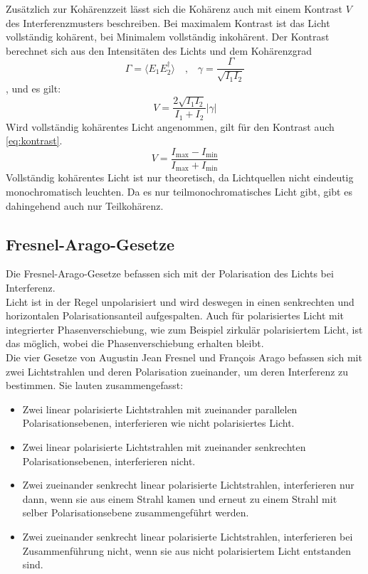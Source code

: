 Zusätzlich zur Kohärenzzeit lässt sich die Kohärenz auch mit einem Kontrast $V$ des Interferenzmusters beschreiben.
Bei maximalem Kontrast ist das Licht vollständig kohärent, bei Minimalem vollständig inkohärent.
Der Kontrast berechnet sich aus den Intensitäten des Lichts und dem Kohärenzgrad
\begin{equation}
    \Gamma = \langle E_1 E_2^\dagger \rangle \quad \text{,} \quad \gamma = \frac{\Gamma}{\sqrt{I_1 I_2}}
    \label{eq:grad}
\end{equation}
, und es gilt:
\begin{equation}
    V = \frac{2\sqrt{I_1I_2}}{I_1 + I_2}|\gamma|
    \label{eq:kontrast_formel}
\end{equation}
Wird vollständig kohärentes Licht angenommen, gilt für den Kontrast auch \autoref{eq:kontrast}.
\begin{equation}
    V = \frac{I_{\text{max}} - I_{\text{min}}}{I_{\text{max}} + I_{\text{min}}}
    \label{eq:kontrast}
\end{equation}
Vollständig kohärentes Licht ist nur theoretisch, da Lichtquellen nicht eindeutig monochromatisch leuchten.
Da es nur teilmonochromatisches Licht gibt, gibt es dahingehend auch nur Teilkohärenz.

\subsection{Fresnel-Arago-Gesetze}
Die Fresnel-Arago-Gesetze befassen sich mit der Polarisation des Lichts bei Interferenz.\\
Licht ist in der Regel unpolarisiert und wird deswegen in einen senkrechten und horizontalen Polarisationsanteil aufgespalten.
Auch für polarisiertes Licht mit integrierter Phasenverschiebung, wie zum Beispiel zirkulär polarisiertem Licht, ist das möglich, wobei die Phasenverschiebung erhalten bleibt.\\
Die vier Gesetze von Augustin Jean Fresnel und François Arago befassen sich mit zwei Lichtstrahlen und deren Polarisation zueinander, um deren Interferenz zu bestimmen.
Sie lauten zusammengefasst:
\begin{itemize}
    \item Zwei linear polarisierte Lichtstrahlen mit zueinander parallelen Polarisationsebenen, interferieren wie nicht polarisiertes Licht.
    \item Zwei linear polarisierte Lichtstrahlen mit zueinander senkrechten Polarisationsebenen, interferieren nicht.
    \item Zwei zueinander senkrecht linear polarisierte Lichtstrahlen, interferieren nur dann, wenn sie aus einem Strahl kamen und erneut zu einem Strahl mit selber Polarisationsebene zusammengeführt werden.
    \item Zwei zueinander senkrecht linear polarisierte Lichtstrahlen, interferieren bei Zusammenführung nicht, wenn sie aus nicht polarisiertem Licht entstanden sind.
\end{itemize}

